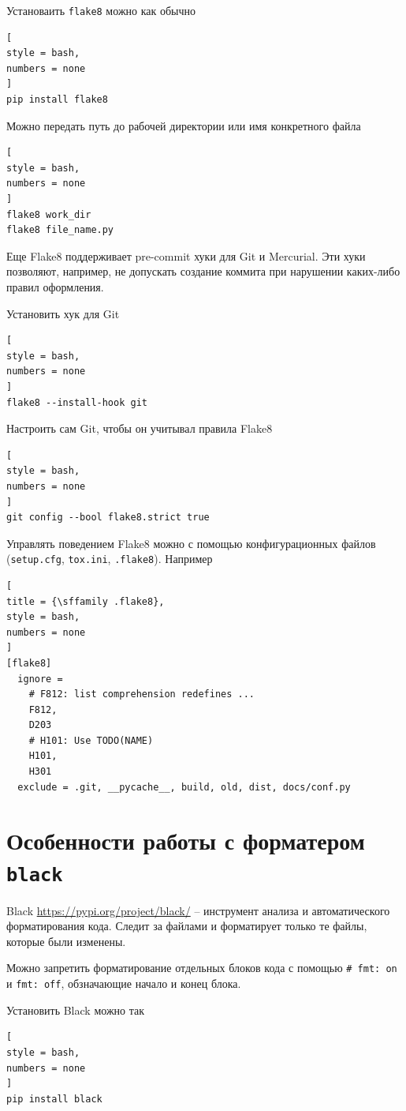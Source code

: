 \documentclass[%
	11pt,
	a4paper,
	utf8,
		]{article}
\begin{document}
Установаить \texttt{flake8} можно как обычно
\begin{lstlisting}[
style = bash,
numbers = none	
]
pip install flake8
\end{lstlisting} 

Можно передать путь до рабочей директории или имя конкретного файла
\begin{lstlisting}[
style = bash,
numbers = none	
]
flake8 work_dir
flake8 file_name.py
\end{lstlisting}

Еще Flake8 поддерживает pre-commit хуки для Git и Mercurial. Эти хуки позволяют, например, не допускать создание коммита при нарушении каких-либо правил оформления. 

Установить хук для Git 
\begin{lstlisting}[
style = bash,
numbers = none	
]
flake8 --install-hook git
\end{lstlisting}

Настроить сам Git, чтобы он учитывал правила Flake8
\begin{lstlisting}[
style = bash,
numbers = none	
]
git config --bool flake8.strict true
\end{lstlisting}

Управлять поведением Flake8 можно с помощью конфигурационных файлов (\texttt{setup.cfg}, \texttt{tox.ini}, \texttt{.flake8}). Например
\begin{lstlisting}[
title = {\sffamily .flake8},
style = bash,
numbers = none	
]
[flake8]
  ignore =
    # F812: list comprehension redefines ...
    F812,
    D203
    # H101: Use TODO(NAME)
    H101,
    H301
  exclude = .git, __pycache__, build, old, dist, docs/conf.py
\end{lstlisting}


\section{Особенности работы с форматером \texttt{black}}

Black \url{https://pypi.org/project/black/} -- инструмент анализа и автоматического форматирования кода. Следит за файлами и форматирует только те файлы, которые были изменены. 

Можно запретить форматирование отдельных блоков кода с помощью \verb|# fmt: on| и \verb|fmt: off|, обзначающие начало и конец блока.

Установить Black можно так
\begin{lstlisting}[
style = bash,
numbers = none	
]
pip install black
\end{lstlisting}
\end{document}
